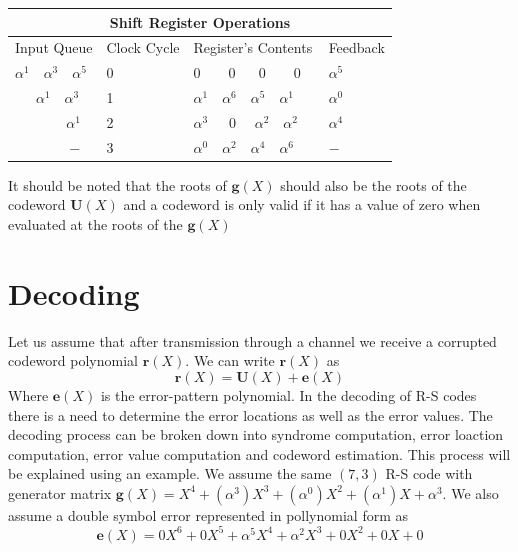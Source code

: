 \documentclass[fontsize=12pt]{article}
\begin{document}
\begin{tabular}{ |p{3cm}||p{3cm}|p{3cm}|p{3cm}|  }
 \hline
 \multicolumn{4}{|c|}{Shift Register Operations} \\
 \hline
 Input Queue & Clock Cycle &Register's Contents&Feedback\\
 \hline
 $\alpha^1 \,\,\,\,\,\,	 \alpha^3 \,\,\,\,\,\, 	 \alpha^5$   & 0   &$0 \,\,\,\,\,\,\,\,\,\,\,\,   0 \,\,\,\,\,\,\,\,\,\,   0 \,\,\,\,\,\,\,\,\,\,\,\,   0 \,\,\,\,\,\, $& $\alpha^5$  \\
 $ \,\,\,\,\,\,\,\,\, \alpha^1\,\,\,\,\,\, \alpha^3$   &1& $\alpha^1 \,\,\,\,\,\,   \alpha^6 \,\,\,\,\,\,   \alpha^5 \,\,\,\,\,\,   \alpha^1 \,\,\,\,\,\, $ & $\alpha^0$\\
$\,\,\,\,\,\,\,\,\,\,\,\,\,\,\,\,\,\,\,\,\,\, \alpha^1$   & 2  &$\alpha^3 \,\,\,\,\,\,\,\,\,   0 \,\,\,\,\,\,\,\,  \alpha^2 \,\,\,\,\,\,   \alpha^2 \,\,\,\,\,\, $ & $\alpha^4$\\
 $\,\,\,\,\,\,\,\,\,\,\,\,\,\,\,\,\,\,\,\,\,\,-$   & 3   &$\alpha^0 \,\,\,\,\,\,   \alpha^2 \,\,\,\,\,\,   \alpha^4 \,\,\,\,\,\,   \alpha^6 \,\,\,\,\,\, $ & $-$\\
 \hline
\end{tabular}
It should be noted that the roots of $\mathbf{g}(X)$ should also be the roots of the codeword $\mathbf{U}(X)$ and a codeword is only valid if it has a value of zero when evaluated at the roots of the  $\mathbf{g}(X)$

\section{Decoding}
Let us assume that after transmission through a channel we receive a corrupted codeword polynomial $\mathbf{r}(X)$. We can write  $\mathbf{r}(X)$ as
\begin{equation}
 \mathbf{r}(X)= \mathbf{U}(X)+ \mathbf{e}(X)
\end{equation}
Where  $\mathbf{e}(X)$ is the error-pattern polynomial. In the decoding of R-S codes there is a need to determine the error locations as well as the error values. The decoding process can be broken down into syndrome computation, error loaction computation, error value computation and codeword estimation. This process will be explained using an example. We assume the same $(7,3)$ R-S code with generator matrix $\mathbf{g}(X)=X^4 + (\alpha^3)X^3 + (\alpha^0)X^2 + (\alpha^1) X +\alpha^3$. We also assume a double symbol error represented in pollynomial form as
$$\mathbf{e}(X) = 0X^6 + 0X^5 + \alpha^5X^4+\alpha^2X^3 + 0X^2 + 0X +0$$
\end{document}
